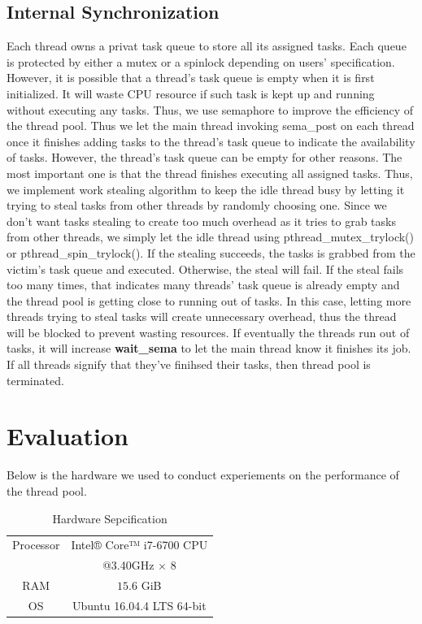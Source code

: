\documentclass[journal, a4paper]{IEEEtran}
\begin{document}
\subsection{Internal Synchronization}
Each thread owns a privat task queue to store all its assigned tasks. Each queue is protected by either a mutex or a spinlock depending on users' specification. However, it is possible that a thread's task queue is empty when it is first initialized. It will waste CPU resource if such task is kept up and running without executing any tasks. Thus, we use semaphore to improve the efficiency of the thread pool. Thus we let the main thread invoking sema\_post on each thread once it finishes adding tasks to the thread's task queue to indicate the availability of tasks. However, the thread's task queue can be empty for other reasons. The most important one is that the thread finishes executing all assigned tasks. Thus, we implement work stealing algorithm to keep the idle thread busy by letting it trying to steal tasks from other threads by randomly choosing one. Since we don't want tasks stealing to create too much overhead as it tries to grab tasks from other threads, we simply let the idle thread using pthread\_mutex\_trylock() or pthread\_spin\_trylock(). If the stealing succeeds, the tasks is grabbed from the victim's task queue and executed. Otherwise, the steal will fail. If the steal fails too many times, that indicates many threads' task queue is already empty and the thread pool is getting close to running out of tasks. In this case, letting more threads trying to steal tasks will create unnecessary overhead, thus the thread will be blocked to prevent wasting resources. If eventually the threads run out of tasks, it will increase \textbf{wait\_sema} to let the main thread know it finishes its job. If all threads signify that they've finihsed their tasks, then thread pool is terminated.

\section{Evaluation}
Below is the hardware we used to conduct experiements on the performance of the thread pool.
	\begin{table}[!hbt]
	\begin{center}
		\caption{Hardware Sepcification}
		\label{tab:simParameters}
		\begin{tabular}{|c|c|}
			\hline
			Processor & Intel® Core™ i7-6700 CPU \\
								&@3.40GHz $\times$ 8\\
			\hline
			RAM & $15.6$ GiB \\
			\hline
			OS & Ubuntu 16.04.4 LTS 64-bit\\
			\hline
		\end{tabular}
		\end{center}
	\end{table}
	
\end{document}
